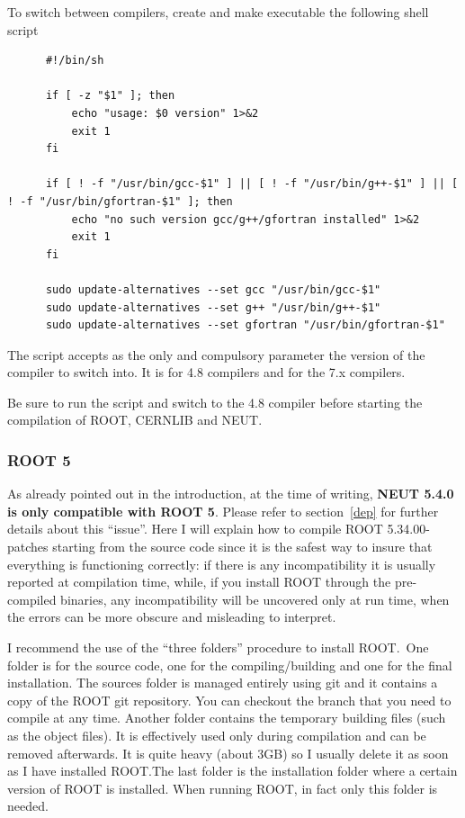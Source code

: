 To switch between compilers, create and make executable the following
shell script
\begin{lstlisting}
      #!/bin/sh

      if [ -z "$1" ]; then
          echo "usage: $0 version" 1>&2
          exit 1
      fi

      if [ ! -f "/usr/bin/gcc-$1" ] || [ ! -f "/usr/bin/g++-$1" ] || [ ! -f "/usr/bin/gfortran-$1" ]; then
          echo "no such version gcc/g++/gfortran installed" 1>&2
          exit 1
      fi

      sudo update-alternatives --set gcc "/usr/bin/gcc-$1"
      sudo update-alternatives --set g++ "/usr/bin/g++-$1"
      sudo update-alternatives --set gfortran "/usr/bin/gfortran-$1"
\end{lstlisting}
The script accepts as the only and compulsory parameter the version of
the compiler to switch into. It is  for 4.8 compilers
and  for the 7.x compilers.

Be sure to run the script and switch to the 4.8 compiler before
starting the compilation of ROOT, CERNLIB and NEUT.\@ 

\subsubsection{ROOT 5}\label{root5}
As already pointed out in the introduction, at the time of writing,
\textbf{NEUT 5.4.0 is only compatible with ROOT 5}. Please refer to
section~\ref{dep} for further details about this ``issue''.  Here I
will explain how to compile ROOT 5.34.00-patches starting from the
source code since it is the safest way to insure that everything is
functioning correctly: if there is any incompatibility it is usually
reported at compilation time, while, if you install ROOT through the
pre-compiled binaries, any incompatibility will be uncovered only at
run time, when the errors can be more obscure and misleading to
interpret.

I recommend the use of the ``three folders'' procedure to install
ROOT.\ One folder is for the source code, one for the
compiling/building and one for the final installation. The sources
folder is managed entirely using git and it contains a copy of the
ROOT git repository. You can checkout the branch that you need to
compile at any time. Another folder contains the temporary building
files (such as the object files). It is effectively used only during
compilation and can be removed afterwards. It is quite heavy (about
3GB) so I usually delete it as soon as I have installed ROOT.\@ The
last folder is the installation folder where a certain version of ROOT
is installed. When running ROOT, in fact only this folder is needed.

